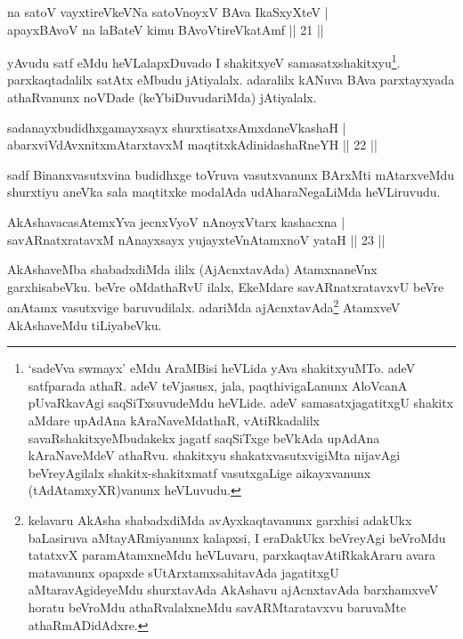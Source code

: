 \begin{shl}
na satoV vayxtireVkeVNa satoV\s noyxV BAva IkaSxyXteV |\\
apayxBAvoV na laBateV kimu BAvoV\s tireVkatAmf \hfill || 21 ||
\end{shl}

\begin{artha}
yAvudu satf eMdu heVLalapxDuvado I shakitxyeV samasatxshakitxyu\footnote[2]{`sadeVva swmayx' eMdu AraMBisi heVLida yAva shakitxyuMTo.  adeV satfparada athaR. adeV teVjasusx, jala, paqthivigaLanunx AloVcanA pUvaRkavAgi saqSiTxsuvudeMdu heVLide. adeV samasatxjagatitxgU shakitx aMdare upAdAna kAraNaveMdathaR, vAtiRkadalilx savaRshakitxyeMbudakekx jagatf saqSiTxge beVkAda upAdAna kAraNaveMdeV athaRvu. shakitxyu shakatxvasutxvigiMta nijavAgi beVreyAgilalx shakitx-shakitxmatf vasutxgaLige aikayxvanunx (tAdAtamxyXR)vanunx heVLuvudu.}. parxkaqtadalilx satAtx eMbudu jAtiyalalx. adaralilx kANuva BAva parxtayxyada athaRvanunx noVDade (keYbiDuvudariMda) jAtiyalalx.
\end{artha}


\begin{shl}
sadanayxbudidhxgamayxsayx shurxtisatxsAmxdaneVkashaH |\\
abarxviVdAvxnitxmAtarxtavxM maqtitxkAdinidashaRneYH \hfill || 22 ||
\end{shl}

\begin{artha}
sadf Binanxvasutxvina budidhxge toVruva vasutxvanunx BArxMti mAtarxveMdu shurxtiyu aneVka sala maqtitxke modalAda udAharaNegaLiMda heVLiruvudu.
\end{artha}


\begin{shl}
AkAshavacasA\s \s temxYva jecnxVyoV nAnoyxV\s tarx kashacxna |\\
savARnatxratavxM nAnayxsayx yujayxteV\s nAtamxnoV yataH \hfill || 23 ||
\end{shl}

\begin{artha}
AkAshaveMba shabadxdiMda ililx (AjAcnxtavAda) AtamxnaneVnx garxhisabeVku. beVre oMdathaRvU ilalx, EkeMdare savARnatxratavxvU beVre anAtamx vasutxvige baruvudilalx. adariMda ajAcnxtavAda\footnote[1]{kelavaru AkAsha shabadxdiMda avAyxkaqtavanunx garxhisi adakUkx baLasiruva aMtayARmiyanunx kalapxsi, I eraDakUkx beVreyAgi beVroMdu tatatxvX paramAtamxneMdu heVLuvaru, parxkaqtavAtiRkakAraru avara matavanunx opapxde sUtArxtamxsahitavAda jagatitxgU aMtaravAgideyeMdu shurxtavAda AkAshavu ajAcnxta\-vAda barxhamxveV horatu beVroMdu athaRvalalxneMdu savARMtaratavxvu baruvaMte athaRmADidAdxre.} AtamxveV AkAshaveMdu tiLiyabeVku.
\end{artha}

